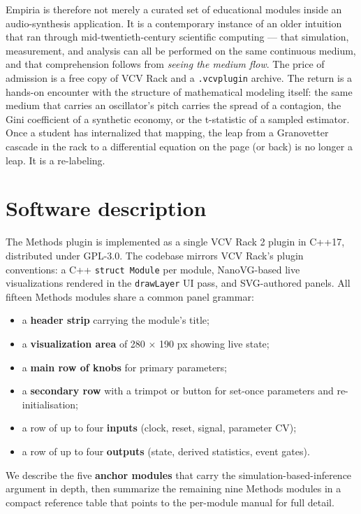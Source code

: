 Empiria is therefore not merely a curated set of educational modules
inside an audio-synthesis application. It is a contemporary instance of
an older intuition that ran through mid-twentieth-century scientific
computing --- that simulation, measurement, and analysis can all be
performed on the same continuous medium, and that comprehension follows
from \emph{seeing the medium flow}. The price of admission is a free
copy of VCV Rack and a \texttt{.vcvplugin} archive. The return is a
hands-on encounter with the structure of mathematical modeling itself:
the same medium that carries an oscillator's pitch carries the spread of
a contagion, the Gini coefficient of a synthetic economy, or the
t-statistic of a sampled estimator. Once a student has internalized that
mapping, the leap from a Granovetter cascade in the rack to a
differential equation on the page (or back) is no longer a leap. It is a
re-labeling.

\section{Software description}\label{software-description}

The Methods plugin is implemented as a single VCV Rack 2 plugin in
C++17, distributed under GPL-3.0. The codebase mirrors VCV Rack's plugin
conventions: a C++ \texttt{struct\ Module} per module, NanoVG-based live
visualizations rendered in the \texttt{drawLayer} UI pass, and
SVG-authored panels. All fifteen Methods modules share a common panel
grammar:

\begin{itemize}
\tightlist
\item
  a \textbf{header strip} carrying the module's title;
\item
  a \textbf{visualization area} of 280 \ensuremath{\times} 190 px showing live state;
\item
  a \textbf{main row of knobs} for primary parameters;
\item
  a \textbf{secondary row} with a trimpot or button for set-once
  parameters and re-initialisation;
\item
  a row of up to four \textbf{inputs} (clock, reset, signal, parameter
  CV);
\item
  a row of up to four \textbf{outputs} (state, derived statistics, event
  gates).
\end{itemize}

We describe the five \textbf{anchor modules} that carry the
simulation-based-inference argument in depth, then summarize the
remaining nine Methods modules in a compact reference table that points
to the per-module manual for full detail.

